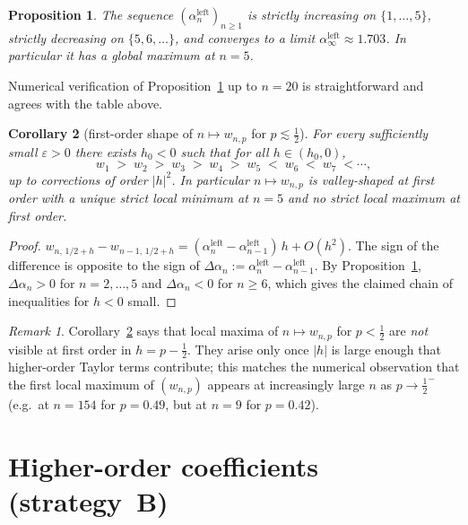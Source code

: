 \documentclass{article}
\newtheorem{proposition}{Proposition}
\newtheorem{corollary}[proposition]{Corollary}
\theoremstyle{remark}
\newtheorem*{remark}{Remark}
\begin{document}
\begin{proposition}\label{prop:alphaleft}
  The sequence $(\alpha_{n}^{\text{left}})_{n\ge1}$ is strictly
  increasing on $\{1,\dots,5\}$, strictly decreasing on $\{5,6,\dots\}$,
  and converges to a limit $\alpha_{\infty}^{\text{left}}\approx 1.703$.
  In particular it has a global maximum at $n=5$.
\end{proposition}

Numerical verification of Proposition~\ref{prop:alphaleft} up to $n=20$ is
straightforward and agrees with the table above.

\begin{corollary}[first-order shape of $n\mapsto w_{n,p}$ for
$p\lesssim\tfrac12$]
\label{cor:valley}
  For every sufficiently small $\varepsilon>0$ there exists $h_{0}<0$
  such that for all $h\in(h_{0},0)$,
  \[
    w_{1}\;>\;w_{2}\;>\;w_{3}\;>\;w_{4}\;>\;w_{5}\;<\;w_{6}\;<\;w_{7}\;<\cdots,
  \]
  up to corrections of order $|h|^{2}$. In particular $n\mapsto w_{n,p}$
  is valley-shaped at first order with a unique strict local minimum at
  $n=5$ and \emph{no} strict local maximum at first order.
\end{corollary}

\begin{proof}
  $w_{n,\,1/2+h}-w_{n-1,\,1/2+h}=
  (\alpha_{n}^{\text{left}}-\alpha_{n-1}^{\text{left}})\,h+O(h^{2})$.
  The sign of the difference is opposite to the sign of
  $\Delta\alpha_{n}:=\alpha_{n}^{\text{left}}-\alpha_{n-1}^{\text{left}}$.
  By Proposition~\ref{prop:alphaleft}, $\Delta\alpha_{n}>0$ for
  $n=2,\dots,5$ and $\Delta\alpha_{n}<0$ for $n\ge6$, which gives the
  claimed chain of inequalities for $h<0$ small.
\end{proof}

\begin{remark}
  Corollary~\ref{cor:valley} says that local maxima of $n\mapsto w_{n,p}$
  for $p<\tfrac12$ are \emph{not} visible at first order in $h=p-\tfrac12$.
  They arise only once $|h|$ is large enough that higher-order Taylor
  terms contribute; this matches the numerical observation that the first
  local maximum of $(w_{n,p})$ appears at increasingly large $n$ as
  $p\to\tfrac12^-$ (e.g.\ at $n=154$ for $p=0.49$, but at $n=9$ for
  $p=0.42$).
\end{remark}

\section{Higher-order coefficients (strategy~B)}
\end{document}
